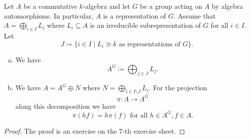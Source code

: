 \begin{lem}
 Let $A$ be a commutative $k$-algebra and let $G$ be a group acting on $A$ by algebra automorphisms. In particular, $A$ is a representation of $G$. Assume that $A = \bigoplus_{i \in I} L_i$ where $L_i \subseteq A$ is an irreducible subrepresentation of $G$ for all $i \in I$. Let
 \[
  J \coloneqq \{i \in I \mid L_i \cong k \text{ as representations of $G$}\}.
 \]
 \begin{enumerate}[a)]
  \item
  We have
  \[
   A^G \coloneqq \bigoplus_{j \in J} L_j.
  \]
  \item
  We have $A = A^G \oplus N$ where $N = \bigoplus_{i \in I \setminus J} L_i$. For the projection
  \[
   \pi \colon A \to A^G
  \]
  along this decomposition we have
  \[
   \pi(hf) = h\pi(f) \text{ for all } h \in A^G, f \in A.
  \]
 \end{enumerate}
\end{lem}
\begin{proof}
 The proof is an exercise on the $7$-th exercise sheet.
\end{proof}






















































